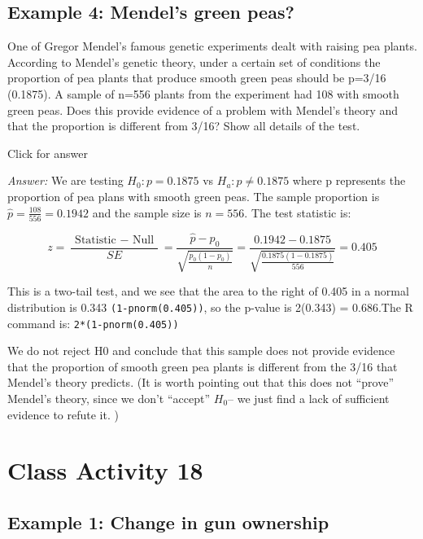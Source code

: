 \documentclass[
]{book}
\begin{document}
\hypertarget{example-4-mendels-green-peas}{%
\section{Example 4: Mendel's green peas?}\label{example-4-mendels-green-peas}}

One of Gregor Mendel's famous genetic experiments dealt with raising pea plants. According to Mendel's genetic theory, under a certain set of conditions the proportion of pea plants that produce smooth green peas should be p=3/16 (0.1875). A sample of n=556 plants from the experiment had 108 with smooth green peas. Does this provide evidence of a problem with Mendel's theory and that the proportion is different from 3/16? Show all details of the test.

Click for answer

\emph{Answer:} We are testing \(H_{0}: p=0.1875\) vs \(H_{a}: p \neq 0.1875\) where p represents the proportion of pea plans with smooth green peas. The sample proportion is \(\hat{p}=\frac{108}{556}=0.1942\) and the sample size is \(n=556\). The test statistic is:

\[z=\frac{\text { Statistic }-\text { Null }}{S E}=\frac{\hat{p}-p_{0}}{\sqrt{\frac{p_{0}\left(1-p_{0}\right)}{n}}}=\frac{0.1942-0.1875}{\sqrt{\frac{0.1875(1-0.1875)}{556}}}=0.405\]

This is a two-tail test, and we see that the area to the right of 0.405 in a normal distribution is 0.343 \texttt{(1-pnorm(0.405))}, so the p-value is 2(0.343) = 0.686.The R command is: \texttt{2*(1-pnorm(0.405))}

We do not reject H0 and conclude that this sample does not provide evidence that the proportion of smooth green pea plants is different from the 3/16 that Mendel's theory predicts. (It is worth pointing out that this does not ``prove'' Mendel's theory, since we don't ``accept'' \(H_0\)-- we just find a lack of sufficient evidence to refute it. )

\hypertarget{class-activity-18}{%
\chapter{Class Activity 18}\label{class-activity-18}}

\hypertarget{example-1-change-in-gun-ownership}{%
\section{Example 1: Change in gun ownership}\label{example-1-change-in-gun-ownership}}
\end{document}
